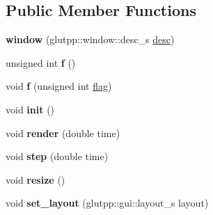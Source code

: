 \subsection*{\-Public \-Member \-Functions}
\begin{DoxyCompactItemize}
\item 
\hypertarget{classglutpp_1_1window_1_1window_a5fb22f78c9b505fa0254c109d91dd82b}{{\bfseries window} (glutpp\-::window\-::desc\-\_\-s \hyperlink{classglutpp_1_1window_1_1desc}{desc})}\label{classglutpp_1_1window_1_1window_a5fb22f78c9b505fa0254c109d91dd82b}

\item 
\hypertarget{classglutpp_1_1window_1_1window_ace93088420114b3a20512029114f3d34}{unsigned int {\bfseries f} ()}\label{classglutpp_1_1window_1_1window_ace93088420114b3a20512029114f3d34}

\item 
\hypertarget{classglutpp_1_1window_1_1window_a5d4f65d65163664b0ff4f805cabf46b2}{void {\bfseries f} (unsigned int \hyperlink{structglutpp_1_1window_1_1window_1_1flag}{flag})}\label{classglutpp_1_1window_1_1window_a5d4f65d65163664b0ff4f805cabf46b2}

\item 
\hypertarget{classglutpp_1_1window_1_1window_ad7992d03a87b54eee6803f516010e845}{void {\bfseries init} ()}\label{classglutpp_1_1window_1_1window_ad7992d03a87b54eee6803f516010e845}

\item 
\hypertarget{classglutpp_1_1window_1_1window_a67657822c06744de46ace525b5a7bac3}{void {\bfseries render} (double time)}\label{classglutpp_1_1window_1_1window_a67657822c06744de46ace525b5a7bac3}

\item 
\hypertarget{classglutpp_1_1window_1_1window_a89a16c58a5a89beeef982b4fcd29c348}{void {\bfseries step} (double time)}\label{classglutpp_1_1window_1_1window_a89a16c58a5a89beeef982b4fcd29c348}

\item 
\hypertarget{classglutpp_1_1window_1_1window_a25ea811ebe0dcb6e18d25ab6d018d156}{void {\bfseries resize} ()}\label{classglutpp_1_1window_1_1window_a25ea811ebe0dcb6e18d25ab6d018d156}

\item 
\hypertarget{classglutpp_1_1window_1_1window_a55c493d6886632f62f0de20072e4b67e}{void {\bfseries set\-\_\-layout} (glutpp\-::gui\-::layout\-\_\-s layout)}\label{classglutpp_1_1window_1_1window_a55c493d6886632f62f0de20072e4b67e}


\end{DoxyCompactItemize}
